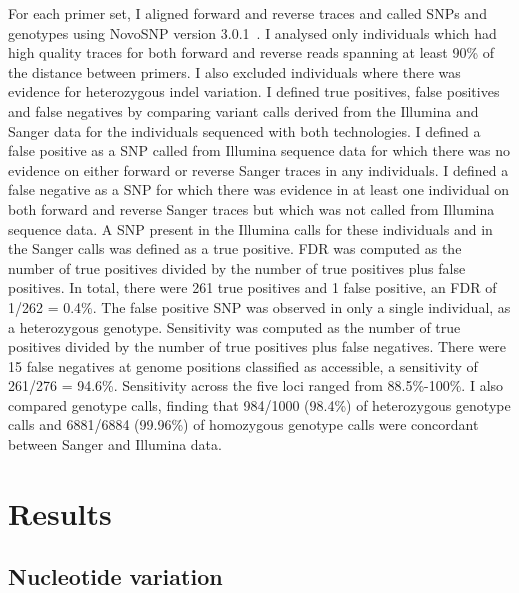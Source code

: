 \documentclass[a4paper,11pt,abstracton,hidelinks]{scrartcl}
\begin{document}
For each primer set, I aligned forward and reverse traces and called SNPs and genotypes using NovoSNP version 3.0.1~\parencite{Weckx2005}.
%
I analysed only individuals which had high quality traces for both forward and reverse reads spanning at least 90\% of the distance between primers.
%
I also excluded individuals where there was evidence for heterozygous indel variation.
%
I defined true positives, false positives and false negatives by comparing variant calls derived from the Illumina and Sanger data for the individuals sequenced with both technologies.
%
I defined a false positive as a SNP called from Illumina sequence data for which there was no evidence on either forward or reverse Sanger traces in any individuals.
%
I defined a false negative as a SNP for which there was evidence in at least one individual on both forward and reverse Sanger traces but which was not called from Illumina sequence data.
%
A SNP present in the Illumina calls for these individuals and in the Sanger calls was defined as a true positive.
%
FDR was computed as the number of true positives divided by the number of true positives plus false positives.
%
In total, there were 261 true positives and 1 false positive, an FDR of 1/262 = 0.4\%.
%
The false positive SNP was observed in only a single individual, as a heterozygous genotype.
%
Sensitivity was computed as the number of true positives divided by the number of true positives plus false negatives.
%
There were 15 false negatives at genome positions classified as accessible, a sensitivity of 261/276 = 94.6\%.
%
Sensitivity across the five loci ranged from 88.5\%-100\%.
%
I also compared genotype calls, finding that 984/1000 (98.4\%) of heterozygous genotype calls and 6881/6884 (99.96\%) of homozygous genotype calls were concordant between Sanger and Illumina data.


\section{Results}\label{sec:results}


\subsection{Nucleotide variation}\label{subsec:nucleotide-variation}
\end{document}

